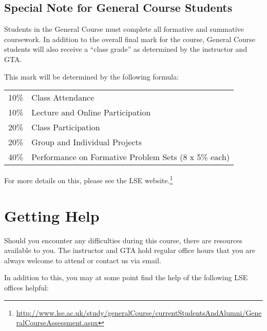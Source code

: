 \documentclass[12pt,a4paper]{article}
\begin{document}
\subsection{Special Note for General Course Students}

Students in the General Course must complete all formative and summative coursework. In addition to the overall final mark for the course, General Course students will also receive a ``class grade'' as determined by the instructor and GTA. 

This mark will be determined by the following formula:

\begin{center}
\begin{tabular}{rl}
10\% & Class Attendance \\
10\% & Lecture and Online Participation \\
20\% & Class Participation \\
20\% & Group and Individual Projects \\
40\% & Performance on Formative Problem Sets (8 x 5\% each) \\
\end{tabular}
\end{center}

For more details on this, please see the LSE website.\footnote{\url{http://www.lse.ac.uk/study/generalCourse/currentStudentsAndAlumni/GeneralCourseAssessment.aspx}}


\section{Getting Help}

Should you encounter any difficulties during this course, there are resources available to you. The instructor and GTA hold regular office hours that you are always welcome to attend or contact us via email.

In addition to this, you may at some point find the help of the following LSE offices helpful:
\end{document}

